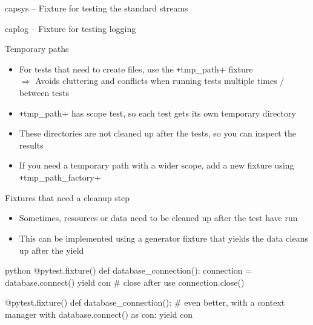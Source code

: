 \documentclass[
  aspectratio=1610,
]{beamer}
\begin{document}
\begin{frame}[c]{capsys – Fixture for testing the standard streams}
\end{frame}

\begin{frame}[c]{caplog – Fixture for testing logging}
\end{frame}

\begin{frame}[c]{Temporary paths}
  \begin{itemize}
    \item For tests that need to create files, use the \texttt+tmp_path+ fixture \\
      $⇒$ Avoids cluttering and conflicts when running tests multiple times / between tests
    \item \texttt+tmp_path+ has scope test, so each test gets its own temporary directory
    \item These directories are not cleaned up after the tests, so you can inspect the results
    \item If you need a temporary path with a wider scope, add a new fixture using \texttt+tmp_path_factory+
  \end{itemize}
\end{frame}


\begin{frame}[c, fragile]{Fixtures that need a cleanup step}
  \begin{itemize}
    \item Sometimes, resources or data need to be cleaned up after the test have run
    \item This can be implemented using a generator fixture that yields the data cleans up after the yield
  \end{itemize}

  \begin{code}{python}
    @pytest.fixture()
    def database_connection():
        connection = database.connect()
        yield con
        # close after use
        connection.close()

    @pytest.fixture()
    def database_connection():
        # even better, with a context manager
        with database.connect() as con:
            yield con
  \end{code}
\end{frame}
\end{document}

